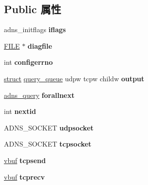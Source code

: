 \subsection*{Public 属性}
\begin{DoxyCompactItemize}
\item 
\mbox{\label{structadns____state_ac5819d45654433f66a5ec9049e60d2eb}} 
adns\+\_\+initflags {\bfseries iflags}
\item 
\mbox{\label{structadns____state_ae23971e888a2ff876c5182438b739c2c}} 
\hyperlink{struct__iobuf}{F\+I\+LE} $\ast$ {\bfseries diagfile}
\item 
\mbox{\label{structadns____state_a44a9213f438b170d3b514f6f0a967267}} 
int {\bfseries configerrno}
\item 
\mbox{\label{structadns____state_a92c76153721917fea15d35a042689f1e}} 
\hyperlink{interfacestruct}{struct} \hyperlink{structquery__queue}{query\+\_\+queue} udpw tcpw childw {\bfseries output}
\item 
\mbox{\label{structadns____state_a0fe8bca58ef4521ae30cb49dd227649a}} 
\hyperlink{structadns____query}{adns\+\_\+query} {\bfseries forallnext}
\item 
\mbox{\label{structadns____state_a7d9c1b684314ddff0c085640f7f4142e}} 
int {\bfseries nextid}
\item 
\mbox{\label{structadns____state_aa2f910f63a0b1962677ae8cf04c80e70}} 
A\+D\+N\+S\+\_\+\+S\+O\+C\+K\+ET {\bfseries udpsocket}
\item 
\mbox{\label{structadns____state_a57ca4945dcd1922a4c0611f0ee6a6ecf}} 
A\+D\+N\+S\+\_\+\+S\+O\+C\+K\+ET {\bfseries tcpsocket}
\item 
\mbox{\label{structadns____state_ae2144538f7195901cbbe70f487ba851d}} 
\hyperlink{structvbuf}{vbuf} {\bfseries tcpsend}
\item 
\mbox{\label{structadns____state_a843742cb77e49fb6a281e9f43455b237}} 
\hyperlink{structvbuf}{vbuf} {\bfseries tcprecv}

\end{DoxyCompactItemize}

